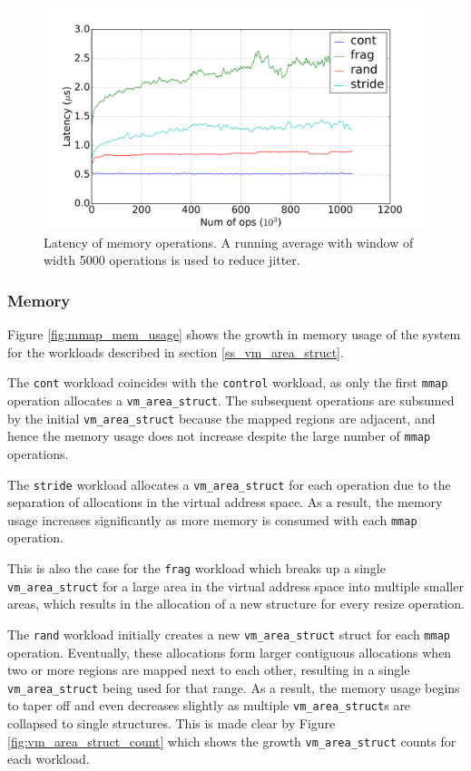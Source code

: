 \documentclass[twocolumn,11pt]{article}
\begin{document}
\begin{figure}[t]
    \includegraphics[width=\columnwidth]{figures/mmap_latency}
    \caption{Latency of memory operations. A running average with window of
    width 5000 operations is used to reduce jitter.}
    \label{fig:mmap_latency}
\end{figure}

\subsubsection{Memory}
Figure \ref{fig:mmap_mem_usage} shows the growth in memory usage of the system
for the workloads described in section \ref{ss_vm_area_struct}. 

The
\texttt{cont} workload coincides with the \texttt{control} workload, as only the
first \texttt{mmap} operation allocates a \texttt{vm\_area\_struct}. The subsequent
operations are subsumed by the initial \texttt{vm\_area\_struct} because the mapped
regions are adjacent, and hence the memory usage does not increase despite the
large number of \texttt{mmap} operations.  

The \texttt{stride} workload allocates a
\texttt{vm\_area\_struct} for each operation due to the separation of
allocations in the virtual address space. As a result, the memory usage
increases significantly as more memory is consumed with each \texttt{mmap} operation.

This is also the case for the \texttt{frag} workload which breaks up a single
\texttt{vm\_area\_struct} for a large area in the virtual address space into
multiple smaller areas, which results in the allocation of a new structure for
every resize operation. 

The \texttt{rand} workload initially creates a new
\texttt{vm\_area\_struct} struct for each \texttt{mmap} operation. Eventually, these
allocations form larger contiguous allocations when two or more regions are
mapped next to each other, resulting in a single \texttt{vm\_area\_struct} being
used for that range. As a result, the memory usage begins to taper off and
even decreases slightly as multiple \texttt{vm\_area\_struct}s are collapsed to
single structures. This is made clear by Figure \ref{fig:vm_area_struct_count}
which shows the growth \texttt{vm\_area\_struct} counts for each workload.
\end{document}
